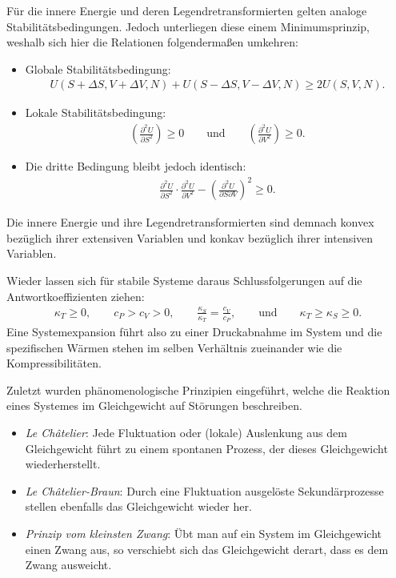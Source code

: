 \begin{summary}
	Für die innere Energie und deren Legendretransformierten gelten analoge Stabilitätsbedingungen. Jedoch unterliegen diese einem Minimumsprinzip, weshalb sich hier die Relationen folgendermaßen umkehren:
	\begin{itemize}
		\item Globale Stabilitätsbedingung: 
		\begin{align*}
			U(S+\Delta S, V+\Delta V,N)+U(S-\Delta S, V-\Delta V,N)\geq2U(S,V,N).
		\end{align*}
		\item Lokale Stabilitätsbedingung:
		\begin{align*}
			\left(\frac{\partial^2U}{\partial S^2}\right)\geq 0\qquad \mathrm{und} \qquad \left(\frac{\partial^2U}{\partial V^2}\right)\geq 0.
		\end{align*}
		\item Die dritte Bedingung bleibt jedoch identisch:
		\begin{align*}
			\frac{\partial ^2U}{\partial S^2}\cdot\frac{\partial ^2U}{\partial V^2}-\left(\frac{\partial ^2U}{\partial S\partial V}\right)^2\geq 0.
		\end{align*}
	\end{itemize} 
	Die innere Energie und ihre Legendretransformierten sind demnach konvex bezüglich ihrer extensiven Variablen und konkav bezüglich ihrer intensiven Variablen.

	Wieder lassen sich für stabile Systeme daraus Schlussfolgerungen auf die Antwortkoeffizienten ziehen:
	\begin{align*}
		\kappa_T\geq 0, \qquad c_P>c_V>0, \qquad \frac{\kappa_S}{\kappa_T}=\frac{c_V}{c_P}, \qquad \mathrm{und} \qquad \kappa_T\geq\kappa_S\geq 0.
	\end{align*}
	Eine Systemexpansion führt also zu einer Druckabnahme im System und die spezifischen Wärmen stehen im selben Verhältnis zueinander wie die Kompressibilitäten.

	Zuletzt wurden phänomenologische Prinzipien eingeführt, welche die Reaktion eines Systemes im Gleichgewicht auf Störungen beschreiben.
	\begin{itemize}
		\item \emph{Le Châtelier}: Jede Fluktuation oder (lokale) Auslenkung aus dem Gleichgewicht führt zu einem
		spontanen Prozess, der dieses Gleichgewicht wiederherstellt.
		\item \emph{Le Châtelier-Braun}: Durch eine Fluktuation ausgelöste Sekundärprozesse stellen ebenfalls das
		Gleichgewicht wieder her.
		\item \emph{Prinzip vom kleinsten Zwang}: Übt man auf ein System im Gleichgewicht einen Zwang aus, so verschiebt sich das Gleichgewicht derart, dass es dem Zwang ausweicht.
	\end{itemize}
\end{summary}